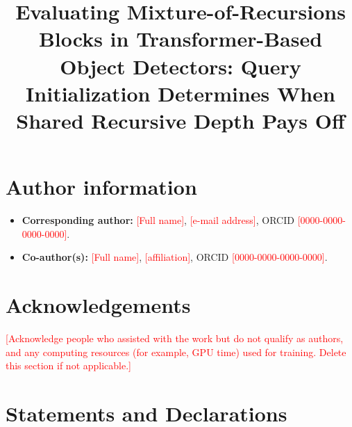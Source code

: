 \documentclass[pdflatex,iicol,sn-basic,Numbered]{sn-jnl}
\newcommand{\ph}[1]{\textcolor{red}{[#1]}}
\begin{document}
\title[Mixture-of-Recursions in Detection Transformers]{Evaluating Mixture-of-Recursions Blocks in Transformer-Based Object Detectors: Query Initialization Determines When Shared Recursive Depth Pays Off}

\author*[1]{\fnm{\ph{First}} \sur{\ph{Author}}}\email{\ph{corresponding.author@institution.edu}}

\author[1]{\fnm{\ph{Second}} \sur{\ph{Author}}}\email{\ph{second.author@institution.edu}}

\affil*[1]{\orgdiv{\ph{Department}}, \orgname{\ph{Organization}}, \orgaddress{\city{\ph{City}}, \country{\ph{Country}}}}



\maketitle

\section*{Author information}

\begin{itemize}
\item \textbf{Corresponding author:} \ph{Full name}, \ph{e-mail address}, ORCID \ph{0000-0000-0000-0000}.
\item \textbf{Co-author(s):} \ph{Full name}, \ph{affiliation}, ORCID \ph{0000-0000-0000-0000}.
\end{itemize}

\section*{Acknowledgements}
\ph{Acknowledge people who assisted with the work but do not qualify as authors, and any computing resources (for example, GPU time) used for training. Delete this section if not applicable.}

\section*{Statements and Declarations}
\end{document}
